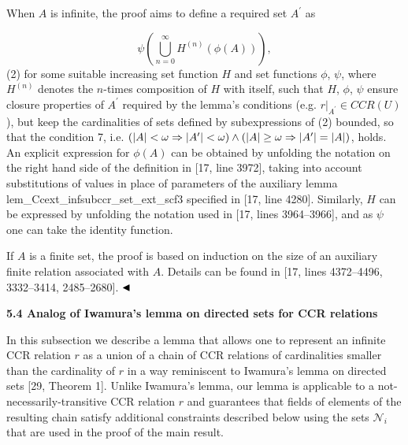When $A$ is infinite, the proof aims to define a required set $A^{\prime}$ as\par
    \[\psi\left(\bigcup_{n=0}^{\infty}H^{(n)}(\phi(A))\right),\]  (2)   
for some suitable increasing set function $H$ and set functions $\phi$, $\psi$, where $H^{(n)}$ denotes the $n$-times composition of $H$ with itself, such that $H$, $\phi$, $\psi$ ensure closure properties of $A^{\prime}$ required by the lemma’s conditions (e.g. $r|_{A^{\prime}}\in CCR(U)$), but keep the cardinalities of sets defined by subexpressions of (2) bounded, so that the condition 7, i.e. $(|A|<\omega\Rightarrow|A^{\prime}|<\omega)\wedge(|A|\geq\omega\Rightarrow|A^{%
\prime}|=|A|)$, holds. An explicit expression for $\phi(A)$ can be obtained by unfolding the notation on the right hand side of the definition in [17, line 3972], taking into account substitutions of values in place of parameters of the auxiliary lemma lem\_Ccext\_infsubccr\_set\_ext\_scf3 specified in [17, line 4280]. Similarly, $H$ can be expressed by unfolding the notation used in [17, lines 3964–3966], and as $\psi$ one can take the identity function.\par
 
 
 
If $A$ is a finite set, the proof is based on induction on the size of an auxiliary finite relation associated with $A$. Details can be found in [17, lines 4372–4496, 3332–3414, 2485–2680]. $\hfill\blacktriangleleft$\par
 
 
 
 
 
\par\medskip\noindent\textbf{5.4 Analog of Iwamura’s lemma on directed sets for CCR relations}\par
 
 
In this subsection we describe a lemma that allows one to represent an infinite CCR relation $r$ as a union of a chain of CCR relations of cardinalities smaller than the cardinality of $r$ in a way reminiscent to Iwamura’s lemma on directed sets [29, Theorem 1]. Unlike Iwamura’s lemma, our lemma is applicable to a not-necessarily-transitive CCR relation $r$ and guarantees that fields of elements of the resulting chain satisfy additional constraints described below using the sets $\mathcal{N}_{i}$ that are used in the proof of the main result.\par
 

